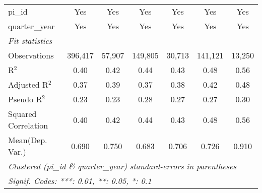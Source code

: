 \begin{tabular}{lcccccc}
   pi\_id                                                     & Yes           & Yes           & Yes           & Yes           & Yes           & Yes\\  
   quarter\_year                                              & Yes           & Yes           & Yes           & Yes           & Yes           & Yes\\  
   \midrule
   \emph{Fit statistics}\\
   Observations                                               & 396,417       & 57,907        & 149,805       & 30,713        & 141,121       & 13,250\\  
   R$^2$                                                      & 0.40          & 0.42          & 0.44          & 0.43          & 0.48          & 0.56\\  
   Adjusted R$^2$                                             & 0.37          & 0.39          & 0.37          & 0.38          & 0.42          & 0.48\\  
   Pseudo R$^2$                                               & 0.23          & 0.23          & 0.28          & 0.27          & 0.27          & 0.30\\  
   Squared Correlation                                        & 0.40          & 0.42          & 0.44          & 0.43          & 0.48          & 0.56\\  
Mean(Dep. Var.) & 0.690 & 0.750 & 0.683 & 0.706 & 0.726 & 0.910 \\
   \midrule \midrule
   \multicolumn{7}{l}{\emph{Clustered (pi\_id \& quarter\_year) standard-errors in parentheses}}\\
   \multicolumn{7}{l}{\emph{Signif. Codes: ***: 0.01, **: 0.05, *: 0.1}}\\
\end{tabular}
\par\endgroup
